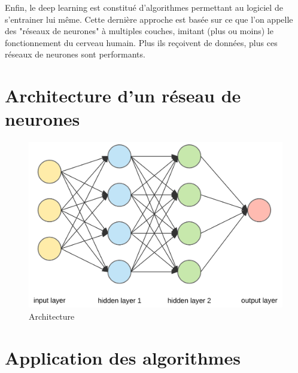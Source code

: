 	Enfin, le deep learning est constitué d'algorithmes permettant au logiciel de s'entrainer lui même. Cette dernière approche est basée sur ce que l'on appelle des "réseaux de neurones" à multiples couches, imitant (plus ou moins) le fonctionnement du cerveau humain. Plus ils reçoivent de données, plus ces réseaux de neurones sont performants. 
	
\section{Architecture d'un réseau de neurones}

\begin{figure}[H]
	\centering
	\includegraphics[width=0.75\linewidth]{images/reseau}
	\caption{Architecture}
\end{figure}
	
	
\section{Application des algorithmes}
